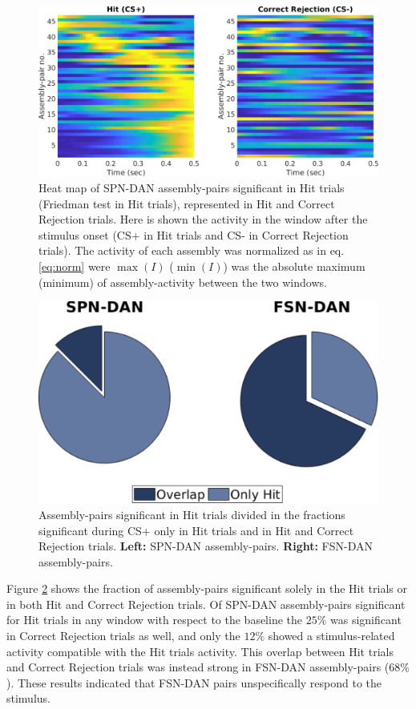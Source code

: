 \begin{figure}[H]
\centering
\includegraphics[scale=0.4]{figures/SD_HitCorrRejComp.pdf}
\caption{Heat map of SPN-DAN assembly-pairs significant in Hit trials (Friedman test in Hit trials), represented in Hit and Correct Rejection trials. Here is shown the activity in the window after the stimulus onset (CS+ in Hit trials and CS- in Correct Rejection trials). The activity of each assembly was normalized as in eq.\ref{eq:norm} were $\max(I)$ ($\min(I)$) was the absolute maximum (minimum) of assembly-activity between the two windows.}
\label{fig:SD_HitCorrComp}
\end{figure}
\begin{figure}[H]
\centering
\includegraphics[scale=0.48]{figures/HItCorrRejPieOverlapSD_FD.pdf}
\caption{Assembly-pairs significant in Hit trials divided in the fractions significant during CS+ only in Hit trials and in Hit and Correct Rejection trials. \textbf{Left:} SPN-DAN assembly-pairs. \textbf{Right:} FSN-DAN assembly-pairs.}
\label{fig:Overlap}
\end{figure}
Figure \ref{fig:Overlap} shows the fraction of assembly-pairs significant solely in the Hit trials or in both Hit and Correct Rejection trials. Of SPN-DAN assembly-pairs significant for Hit trials in any window  with respect to the baseline the $25\%$ was significant in Correct Rejection trials as well, and only the $12\%$ showed a stimulus-related activity compatible with the Hit trials activity. This overlap between Hit trials and Correct Rejection trials was instead strong in FSN-DAN assembly-pairs ($68\%$). These results indicated that FSN-DAN pairs unspecifically respond to the stimulus.
